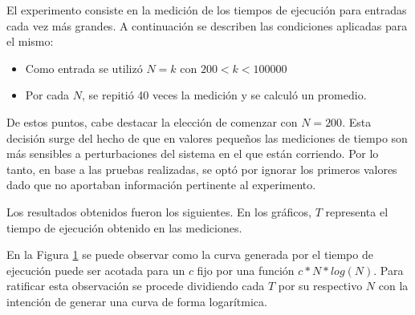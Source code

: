 	El experimento consiste en la medición de los tiempos de ejecución para
	entradas cada vez más grandes. A continuación se describen las condiciones aplicadas
	para el mismo:

	\begin{itemize}
		\item{Como entrada se utilizó $N = k$ con $200 < k < 100000$}
		\item{Por cada $N$, se repitió 40 veces la medición y se calculó un
			promedio.}
	\end{itemize}

	De estos puntos, cabe destacar la elección de comenzar con $N = 200$. Esta
	decisión surge del hecho de que en valores pequeños las mediciones de tiempo
	son más sensibles a perturbaciones del sistema en el que están corriendo.
	Por lo tanto, en base a las pruebas realizadas, se optó por ignorar los
	primeros valores dado que no aportaban información pertinente al experimento.

	Los resultados obtenidos fueron los siguientes. En los gráficos, $T$ representa el
    tiempo de ejecución obtenido en las mediciones.

	\newcommand\constante{3}
	\begin{figure}[H]
		\centering
		\caption{}
		\label{fig:exp1:tiempo_base}
	\end{figure}

	En la Figura \ref{fig:exp1:tiempo_base} se puede observar como la curva generada por el
	tiempo de ejecución puede ser acotada para un $c$ fijo por una función
	$c*N*log(N)$. Para ratificar esta observación se procede dividiendo cada $T$
	por su respectivo $N$ con la intención de generar una curva de forma
	logarítmica.

